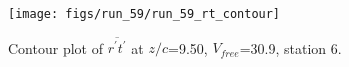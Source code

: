 \begin{figure}[H]
\centering
\texttt{[image: figs/run\_59/run\_59\_rt\_contour]}
\caption{Contour plot of $\overline{r^\prime t^\prime}$ at $z/c$=9.50, $V_{free}$=30.9, station 6.}
\label{fig:run_59_rt_contour}
\end{figure}


